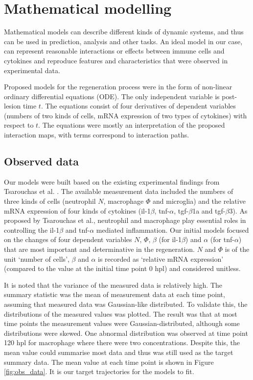 \chapter{Mathematical modelling}

Mathematical models can describe different kinds of dynamic systems, and thus can be used in prediction, analysis and other tasks. An ideal model in our case, can represent reasonable interactions or effects between immune cells and cytokines and reproduce features and characteristics that were observed in experimental data.

Proposed models for the regeneration process were in the form of non-linear ordinary differential equations (ODE). The only independent variable is post-lesion time $t$. The equations consist of four derivatives of dependent variables (numbers of two kinds of cells, mRNA expression of two types of cytokines) with respect to $t$. The equations were mostly an interpretation of the proposed interaction maps, with terms correspond to interaction paths.


\section{Observed data}

Our models were built based on the existing experimental findings from Tsarouchas et al. \cite{ref:Tsarouchas}. The available measurement data included the numbers of three kinds of cells (neutrophil $N$, macrophage $\Phi$ and microglia) and the relative mRNA expression of four kinds of cytokines (il-1$\beta$, tnf-$\alpha$, tgf-$\beta$1a and tgf-$\beta$3). As proposed by Tsarouchas et al., neutrophil and macrophage play essential roles in controlling the il-1$\beta$ and tnf-$\alpha$ mediated inflammation. Our initial models focused on the changes of four dependent variables $N$, $\Phi $, $\beta$ (for il-1$\beta$) and $\alpha$ (for tnf-$\alpha$) that are most important and determinative in the regeneration. $N$ and $\Phi$ is of the unit `number of cells', $\beta$ and $\alpha$ is recorded as `relative mRNA expression' (compared to the value at the initial time point 0 hpl) and considered unitless.

It is noted that the variance of the measured data is relatively high. The summary statistic was the mean of measurement data at each time point, assuming that measured data was Gaussian-like distributed. To validate this, the distributions of the measured values was plotted. The result was that at most time points the measurement values were Gaussian-distributed, although some distributions were skewed. One abnormal distribution was observed at time point 120 hpl for macrophage where there were two concentrations. Despite this, the mean value could summarise most data and thus was still used as the target summary data. The mean value at each time point is shown in Figure \ref{fig:obs_data}. It is our target trajectories for the models to fit.

